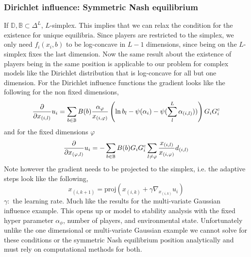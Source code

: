 \documentclass{article}
\newcommand {\B}{\mathbb{B}}
\begin{document}
    \subsubsection{Dirichlet influence: Symmetric Nash equilibrium}
    If $\mathbb{D}, \mathbb{B}\subset \Delta^L$, $L$-simplex. This implies that we can relax the condition for the existence for unique equilibria. Since players are restricted to the simplex, we only need $f_{i}(x_i,b)$ to be log-concave in $L-1$ dimensions, since being on the $L$-simplex fixes the last dimension. Now the same result about the existence of players being in the same position is applicable to our problem for complex models like the Dirichlet distribution that is log-concave for all but one dimension. For the Dirichlet influence functions the gradient looks like the following for the non fixed dimensions, 
    \begin{equation}\label{eq:results_dirl}
        \pdv{}{x_{(i,l)}}u_{i}=\sum_{b\in \B} B(b)\frac{\alpha_{\varphi}}{x_{(i,\varphi)}}\left(\ln{b_{l}}-\psi(\alpha_{i})-\psi(\sum_{l}^{L}\alpha_{(i,l)}))\right)G_{i}G_{i}^{c}
    \end{equation}
    and for the fixed dimensions $\varphi$
    \begin{equation}
        \pdv{}{x_{(\varphi,l)}}u_{i}=-\sum_{b\in \B} B(b)G_{i}G_i^c \sum_{l\neq \varphi}\frac{x_{(i,l)}}{x_{(i,\varphi)}}d_{(i,l)}
    \end{equation}
     Note however the gradient needs to be projected to the simplex, i.e. the adaptive steps look like the following, 
     \begin{equation}\label{eq:SI_projected_grad}
         x_{(i,k+1)}=\text{proj}(x_{(i,k)}+\gamma\nabla_{x_{(i,k)}} u_i)
     \end{equation}
     $\gamma:$ the learning rate. Much like the results for the multi-variate Gaussian influence example. This opens up or model to stability analysis with the fixed hyper parameter $\alpha_{\phi}$, number of players, and environmental state. Unfortunately unlike the one dimensional or multi-variate Gaussian example we cannot solve for these conditions or the symmetric Nash equilibrium position analytically and must rely on computational methods for both. 
     
\end{document}
